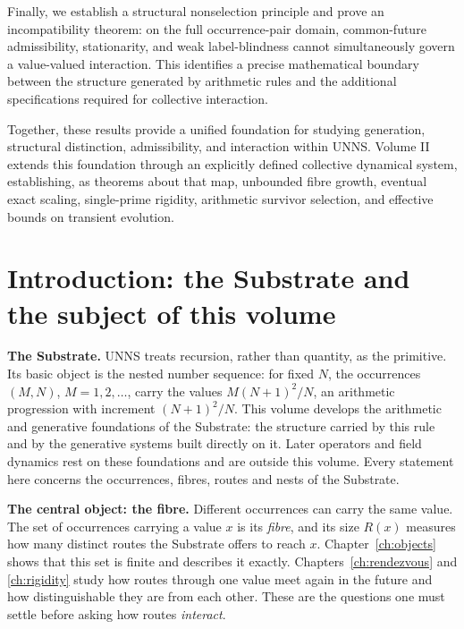 \documentclass[11pt,oneside,openany]{book}
\theoremstyle{definition}
\theoremstyle{remark}
\begin{document}
Finally, we establish a structural nonselection principle and prove an incompatibility theorem: on the full occurrence-pair domain, common-future admissibility, stationarity, and weak label-blindness cannot simultaneously govern a value-valued interaction. This identifies a precise mathematical boundary between the structure generated by arithmetic rules and the additional specifications required for collective interaction.

Together, these results provide a unified foundation for studying generation, structural distinction, admissibility, and interaction within UNNS. Volume II extends this foundation through an explicitly defined collective dynamical system, establishing, as theorems about that map, unbounded fibre growth, eventual exact scaling, single-prime rigidity, arithmetic survivor selection, and effective bounds on transient evolution.

\chapter*{Introduction: the Substrate and the subject of this volume}
\textbf{The Substrate.} UNNS treats recursion, rather than quantity, as the primitive. Its basic object is the nested number sequence: for fixed \(N\), the occurrences \((M,N)\), \(M=1,2,\dots\), carry the values \(M(N+1)^2/N\), an arithmetic progression with increment \((N+1)^2/N\). This volume develops the arithmetic and generative foundations of the Substrate: the structure carried by this rule and by the generative systems built directly on it. Later operators and field dynamics rest on these foundations and are outside this volume. Every statement here concerns the occurrences, fibres, routes and nests of the Substrate.

\textbf{The central object: the fibre.} Different occurrences can carry the same value. The set of occurrences carrying a value \(x\) is its \emph{fibre}, and its size \(R(x)\) measures how many distinct routes the Substrate offers to reach \(x\). Chapter~\ref{ch:objects} shows that this set is finite and describes it exactly. Chapters~\ref{ch:rendezvous} and \ref{ch:rigidity} study how routes through one value meet again in the future and how distinguishable they are from each other. These are the questions one must settle before asking how routes \emph{interact}.
\end{document}
